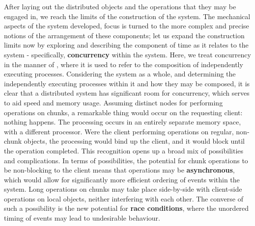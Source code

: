 \documentclass[letterpaper, inpress]{jds} %
\begin{document}
After laying out the distributed objects and the operations that they may be engaged in, we reach the limits of the construction of the system.
The mechanical aspects of the system developed, focus is turned to the more complex and precise notions of the arrangement of these components;
let us expand the construction limits now by exploring and describing the component of time as it relates to the system - specifically, \textbf{concurrency} within the system.
Here, we treat concurrency in the manner of \citet{pike2012concurrency}, where it is used to refer to the composition of independently executing processes.
Considering the system as a whole, and determining the independently executing processes within it and how they may be composed, it is clear that a distributed system has significant room for concurrency, which serves to aid speed and memory usage.
Assuming distinct nodes for performing operations on chunks, a remarkable thing would occur on the requesting client: nothing happens.
The processing occurs in an entirely separate memory space, with a different processor.
Were the client performing operations on regular, non-chunk objects, the processing would bind up the client, and it would block until the operation completed.
This recognition opens up a broad mix of possibilities and complications.
In terms of possibilities, the potential for chunk operations to be non-blocking to the client means that operations may be \textbf{asynchronous}, which would allow for significantly more efficient ordering of events within the system.
Long operations on chunks may take place side-by-side with client-side operations on local objects, neither interfering with each other. The converse of such a possibility is the new potential for \textbf{race conditions}, where the unordered timing of events may lead to undesirable behaviour. 
\end{document}
